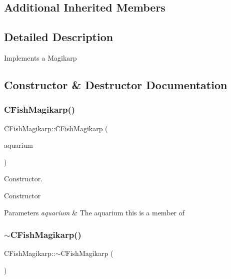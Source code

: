 \subsection*{Additional Inherited Members}


\subsection{Detailed Description}
Implements a Magikarp 

\subsection{Constructor \& Destructor Documentation}
\mbox{\label{class_c_fish_magikarp_a364e91206c27040f653fa6c1bc831765}} 
\subsubsection{\texorpdfstring{C\+Fish\+Magikarp()}{CFishMagikarp()}}
{\footnotesize\ttfamily C\+Fish\+Magikarp\+::\+C\+Fish\+Magikarp (\begin{DoxyParamCaption}\item[{\hyperlink{class_c_aquarium}{C\+Aquarium} $\ast$}]{aquarium }\end{DoxyParamCaption})}



Constructor. 

Constructor 
\begin{DoxyParams}{Parameters}
{\em aquarium} & The aquarium this is a member of \\
\hline
\end{DoxyParams}
\mbox{\label{class_c_fish_magikarp_a6e859fe9c79b553c6b94e110d843e4f9}} 
\subsubsection{\texorpdfstring{$\sim$\+C\+Fish\+Magikarp()}{~CFishMagikarp()}}
{\footnotesize\ttfamily C\+Fish\+Magikarp\+::$\sim$\+C\+Fish\+Magikarp (\begin{DoxyParamCaption}{ }\end{DoxyParamCaption})\hspace{0.3cm}{\ttfamily [virtual]}}



